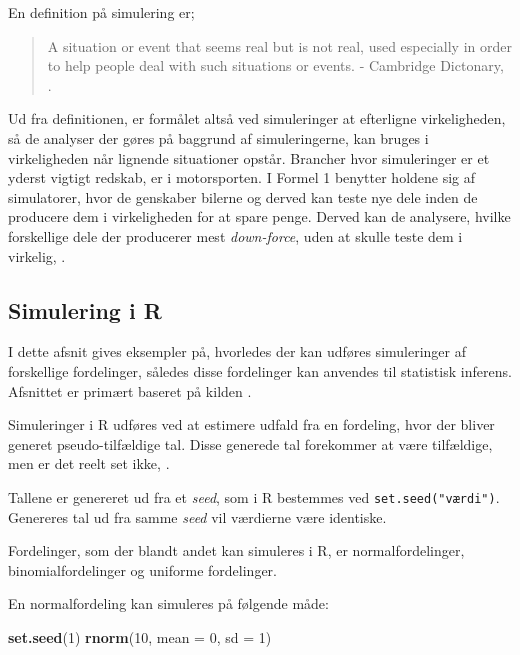 \documentclass[
]{book}
\newenvironment{Shaded}{\begin{snugshade}}{\end{snugshade}}
\newcommand{\DataTypeTok}[1]{\textcolor[rgb]{0.13,0.29,0.53}{#1}}
\newcommand{\DecValTok}[1]{\textcolor[rgb]{0.00,0.00,0.81}{#1}}
\newcommand{\KeywordTok}[1]{\textcolor[rgb]{0.13,0.29,0.53}{\textbf{#1}}}
\newcommand{\NormalTok}[1]{#1}
\theoremstyle{definition}
\theoremstyle{definition}
\theoremstyle{definition}
\theoremstyle{remark}
\begin{document}
En definition på simulering er;

\begin{quote}
A situation or event that seems real but is not real, used especially in order to help people deal with such situations or events. - Cambridge Dictonary, \citep{CambridgeSimulation}.
\end{quote}

Ud fra definitionen, er formålet altså ved simuleringer at efterligne virkeligheden, så de analyser der gøres på baggrund af simuleringerne, kan bruges i virkeligheden når lignende situationer opstår.
Brancher hvor simuleringer er et yderst vigtigt redskab, er i motorsporten. I Formel 1 benytter holdene sig af simulatorer, hvor de genskaber bilerne og derved kan teste nye dele inden de producere dem i virkeligheden for at spare penge. Derved kan de analysere, hvilke forskellige dele der producerer mest \emph{down-force}, uden at skulle teste dem i virkelig, \citep{MercedesF1}.

\hypertarget{simulering-i-r}{%
\subsection{Simulering i R}\label{simulering-i-r}}

I dette afsnit gives eksempler på, hvorledes der kan udføres simuleringer af forskellige fordelinger, således disse fordelinger kan anvendes til statistisk inferens. Afsnittet er primært baseret på kilden \citep{Rsimulation}.

Simuleringer i R udføres ved at estimere udfald fra en fordeling, hvor der bliver generet pseudo-tilfældige tal.
Disse generede tal forekommer at være tilfældige, men er det reelt set ikke, \citep{PRNG}.

Tallene er genereret ud fra et \emph{seed}, som i R bestemmes ved \texttt{set.seed("værdi")}. Genereres tal ud fra samme \emph{seed} vil værdierne være identiske.

Fordelinger, som der blandt andet kan simuleres i R, er normalfordelinger, binomialfordelinger og uniforme fordelinger.

En normalfordeling kan simuleres på følgende måde:

\begin{Shaded}
\begin{Highlighting}[]
\KeywordTok{set.seed}\NormalTok{(}\DecValTok{1}\NormalTok{)}
\KeywordTok{rnorm}\NormalTok{(}\DecValTok{10}\NormalTok{, }\DataTypeTok{mean =} \DecValTok{0}\NormalTok{, }\DataTypeTok{sd =} \DecValTok{1}\NormalTok{)}
\end{Highlighting}
\end{Shaded}
\end{document}
